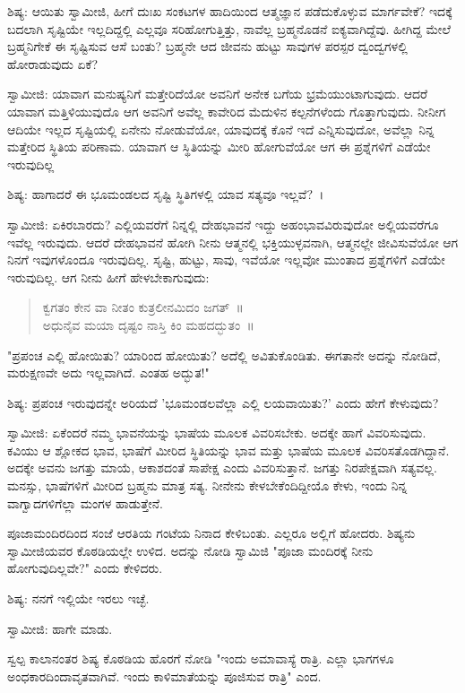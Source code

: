 ಶಿಷ್ಯ: ಆಯಿತು ಸ್ವಾಮೀಜಿ, ಹೀಗೆ ದುಃಖ ಸಂಕಟಗಳ ಹಾದಿಯಿಂದ ಆತ್ಮಜ್ಞಾನ ಪಡೆದುಕೊಳ್ಳುವ ಮಾರ್ಗವೇಕೆ? ಇದಕ್ಕೆ ಬದಲಾಗಿ ಸೃಷ್ಟಿಯೇ ಇಲ್ಲದಿದ್ದಲ್ಲಿ ಎಲ್ಲವೂ ಸರಿಹೋಗುತ್ತಿತ್ತು, ನಾವೆಲ್ಲ ಬ್ರಹ್ಮನೊಡನೆ ಐಕ್ಯವಾಗಿದ್ದೆವು. ಹೀಗಿದ್ದ ಮೇಲೆ ಬ್ರಹ್ಮನಿಗೇಕೆ ಈ ಸೃಷ್ಟಿಸುವ ಆಸೆ ಬಂತು? ಬ್ರಹ್ಮನೇ ಆದ ಜೀವನು ಹುಟ್ಟು ಸಾವುಗಳ ಪರಸ್ಪರ ದ್ವಂದ್ವಗಳಲ್ಲಿ ಹೋರಾಡುವುದು ಏಕೆ?

ಸ್ವಾಮೀಜಿ: ಯಾವಾಗ ಮನುಷ್ಯನಿಗೆ ಮತ್ತೇರಿದೆಯೋ ಅವನಿಗೆ ಅನೇಕ ಬಗೆಯ ಭ್ರಮೆಯುಂಟಾಗುವುದು. ಆದರೆ ಯಾವಾಗ ಮತ್ತಿಳಿಯುವುದೊ ಆಗ ಅವನಿಗೆ ಅವೆಲ್ಲ ಕಾವೇರಿದ ಮೆದುಳಿನ ಕಲ್ಪನೆಗಳೆಂದು ಗೊತ್ತಾಗುವುದು. ನೀನೀಗ ಆದಿಯೇ ಇಲ್ಲದ ಸೃಷ್ಟಿಯಲ್ಲಿ ಏನೇನು ನೋಡುವೆಯೋ, ಯಾವುದಕ್ಕೆ ಕೊನೆ ಇದೆ ಎನ್ನಿಸುವುದೋ, ಅವೆಲ್ಲಾ ನಿನ್ನ ಮತ್ತೇರಿದ ಸ್ಥಿತಿಯ ಪರಿಣಾಮ. ಯಾವಾಗ ಆ ಸ್ಥಿತಿಯನ್ನು ಮೀರಿ ಹೋಗುವೆಯೋ ಆಗ ಈ ಪ್ರಶ್ನೆಗಳಿಗೆ ಎಡೆಯೇ ಇರುವುದಿಲ್ಲ

ಶಿಷ್ಯ: ಹಾಗಾದರೆ ಈ ಭೂಮಂಡಲದ ಸೃಷ್ಟಿ ಸ್ಥಿತಿಗಳಲ್ಲಿ ಯಾವ ಸತ್ಯವೂ ಇಲ್ಲವೆ?~।

ಸ್ವಾಮೀಜಿ: ಏಕಿರಬಾರದು? ಎಲ್ಲಿಯವರೆಗೆ ನಿನ್ನಲ್ಲಿ ದೇಹಭಾವನೆ ಇದ್ದು ಅಹಂಭಾವವಿರುವುದೋ ಅಲ್ಲಿಯವರೆಗೂ ಇವೆಲ್ಲ ಇರುವುದು. ಆದರೆ ದೇಹಭಾವನೆ ಹೋಗಿ ನೀನು ಆತ್ಮನಲ್ಲಿ ಭಕ್ತಿಯುಳ್ಳವನಾಗಿ, ಆತ್ಮನಲ್ಲೇ ಜೀವಿಸುವೆಯೋ ಆಗ ನಿನಗೆ ಇವುಗಳೊಂದೂ ಇರುವುದಿಲ್ಲ. ಸೃಷ್ಟಿ, ಹುಟ್ಟು, ಸಾವು, ಇವೆಯೋ ಇಲ್ಲವೋ ಮುಂತಾದ ಪ್ರಶ್ನೆಗಳಿಗೆ ಎಡೆಯೇ ಇರುವುದಿಲ್ಲ. ಆಗ ನೀನು ಹೀಗೆ ಹೇಳಬೇಕಾಗುವುದು:

\begin{verse}
ಕ್ವಗತಂ ಕೇನ ವಾ ನೀತಂ ಕುತ್ರಲೀನಮಿದಂ ಜಗತ್~॥\\ಅಧುನೈವ ಮಯಾ ದೃಷ್ಟಂ ನಾಸ್ತಿ ಕಿಂ ಮಹದದ್ಭುತಂ~॥
\end{verse}

"ಪ್ರಪಂಚ ಎಲ್ಲಿ ಹೋಯಿತು? ಯಾರಿಂದ ಹೋಯಿತು? ಅದೆಲ್ಲಿ ಅವಿತುಕೊಂಡಿತು. ಈಗತಾನೇ ಅದನ್ನು ನೋಡಿದೆ, ಮರುಕ್ಷಣವೇ ಅದು ಇಲ್ಲವಾಗಿದೆ. ಎಂತಹ ಅದ್ಭುತ!"

ಶಿಷ್ಯ: ಪ್ರಪಂಚ ಇರುವುದನ್ನೇ ಅರಿಯದೆ 'ಭೂಮಂಡಲವೆಲ್ಲಾ ಎಲ್ಲಿ ಲಯವಾಯಿತು?' ಎಂದು ಹೇಗೆ ಕೇಳುವುದು?

ಸ್ವಾಮೀಜಿ: ಏಕೆಂದರೆ ನಮ್ಮ ಭಾವನೆಯನ್ನು ಭಾಷೆಯ ಮೂಲಕ ವಿವರಿಸಬೇಕು. ಅದಕ್ಕೇ ಹಾಗೆ ವಿವರಿಸುವುದು. ಕವಿಯು ಆ ಶ್ಲೋಕದ ಭಾವ, ಭಾಷೆಗೆ ಮೀರಿದ ಸ್ಥಿತಿಯನ್ನು ಭಾವ ಮತ್ತು ಭಾಷೆಯ ಮೂಲಕ ವಿವರಿಸತೊಡಗಿದ್ದಾನೆ. ಅದಕ್ಕೇ ಅವನು ಜಗತ್ತು ಮಾಯೆ, ಆಕಾಶದಂತೆ ಸಾಪೇಕ್ಷ ಎಂದು ವಿವರಿಸುತ್ತಾನೆ. ಜಗತ್ತು ನಿರಪೇಕ್ಷವಾಗಿ ಸತ್ಯವಲ್ಲ. ಮನಸ್ಸು, ಭಾಷೆಗಳಿಗೆ ಮೀರಿದ ಬ್ರಹ್ಮನು ಮಾತ್ರ ಸತ್ಯ. ನೀನೇನು ಕೇಳಬೇಕೆಂದಿದ್ದೀಯೊ ಕೇಳು, ಇಂದು ನಿನ್ನ ವಾಗ್ವಾದಗಳಿಗೆಲ್ಲಾ ಮಂಗಳ ಹಾಡುತ್ತೇನೆ.

ಪೂಜಾಮಂದಿರದಿಂದ ಸಂಜೆ ಆರತಿಯ ಗಂಟೆಯ ನಿನಾದ ಕೇಳಿಬಂತು. ಎಲ್ಲರೂ ಅಲ್ಲಿಗೆ ಹೋದರು. ಶಿಷ್ಯನು ಸ್ವಾಮೀಜಿಯವರ ಕೊಠಡಿಯಲ್ಲೇ ಉಳಿದ. ಅದನ್ನು ನೋಡಿ ಸ್ವಾಮಿಜಿ "ಪೂಜಾ ಮಂದಿರಕ್ಕೆ ನೀನು ಹೋಗುವುದಿಲ್ಲವೇ?" ಎಂದು ಕೇಳಿದರು.

ಶಿಷ್ಯ: ನನಗೆ ಇಲ್ಲಿಯೇ ಇರಲು ಇಚ್ಛೆ.

ಸ್ವಾಮೀಜಿ: ಹಾಗೇ ಮಾಡು.

ಸ್ವಲ್ಪ ಕಾಲಾನಂತರ ಶಿಷ್ಯ ಕೊಠಡಿಯ ಹೊರಗೆ ನೋಡಿ "ಇಂದು ಅಮಾವಾಸ್ಯೆ ರಾತ್ರಿ. ಎಲ್ಲಾ ಭಾಗಗಳೂ ಅಂಧಕಾರದಿಂದಾವೃತವಾಗಿವೆ. ಇಂದು ಕಾಳಿಮಾತೆಯನ್ನು ಪೂಜಿಸುವ ರಾತ್ರಿ" ಎಂದ.

